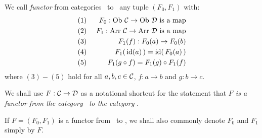 \begin{defin}\label{Fun:def:functor}
    We call {\em functor} from categories \Cat\ to \Dat\ any tuple 
    $(F_{0},F_{1})$ with:
        \begin{eqnarray*}
            (1)&\ &F_{0}:\mbox{\rm Ob}\ \mbox{$\cal C$}\to\mbox{\rm Ob}\ \mbox{$\cal D$}\mbox{\ is a map}\\
            (2)&\ &F_{1}:\mbox{\rm Arr}\ \mbox{$\cal C$}\to\mbox{\rm Arr}\ \mbox{$\cal D$}\mbox{\ is a map}\\
            (3)&\ &F_{1}(f):F_{0}(a)\to F_{0}(b)\\
            (4)&\ &F_{1}(\,\mbox{\rm id}(a)\,)=\mbox{\rm id}(\,F_{0}(a)\,)\\
            (5)&\ &F_{1}(g\circ f)=F_{1}(g)\circ F_{1}(f)
    \end{eqnarray*}
    where $(3)-(5)$ hold for all $a,b,c\in\mbox{$\cal C$}$, $f:a\to b$ and $g:b\to c$.
\end{defin}
\noindent
\begin{notation}\label{Fun:notation:functor:arrow}
    We shall use $F:\mbox{$\cal C$}\to\mbox{$\cal D$}$ as a notational shortcut for the statement 
    that {\em $F$ is a functor from the category \Cat\ to the category \Dat}.
\end{notation}

\begin{notation}\label{Fun:notation:functor:F0:F1}
If $F=(F_{0},F_{1})$ is a functor from \Cat\ to \Dat, we shall also commonly 
denote $F_{0}$ and $F_{1}$ simply by $F$.
\end{notation}


